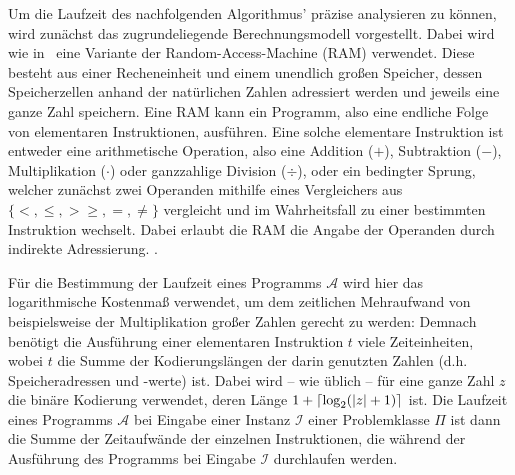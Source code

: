 Um die Laufzeit des nachfolgenden Algorithmus' präzise analysieren zu können, wird zunächst das zugrundeliegende Berechnungsmodell vorgestellt.
Dabei wird wie in~\cite{Gritzmann2013} eine Variante der Random-Access-Machine (RAM) verwendet.
Diese besteht aus einer Recheneinheit und einem unendlich großen Speicher, dessen Speicherzellen anhand der natürlichen Zahlen adressiert werden und jeweils eine ganze Zahl speichern.
Eine RAM kann ein Programm, also eine endliche Folge von elementaren Instruktionen, ausführen.
Eine solche elementare Instruktion ist entweder eine arithmetische Operation, also eine Addition ($+$), Subtraktion ($-$), Multiplikation ($\cdot$) oder ganzzahlige Division ($\div$), oder ein bedingter Sprung, welcher zunächst zwei Operanden mithilfe eines Vergleichers aus $\{ <, \leq, > \geq, =, \neq \}$ vergleicht und im Wahrheitsfall zu einer bestimmten Instruktion wechselt.
Dabei erlaubt die RAM die Angabe der Operanden durch indirekte Adressierung.
.

Für die Bestimmung der Laufzeit eines Programms $\mathcal{A}$ wird hier das logarithmische Kostenmaß verwendet, um dem zeitlichen Mehraufwand von beispielsweise der Multiplikation großer Zahlen gerecht zu werden:
Demnach benötigt die Ausführung einer elementaren Instruktion $t$ viele Zeiteinheiten, wobei $t$ die Summe der Kodierungslängen der darin genutzten Zahlen (d.h. Speicheradressen und -werte) ist.
Dabei wird -- wie üblich -- für eine ganze Zahl $z$ die binäre Kodierung verwendet, deren Länge $1 + \lceil \log_2(\lvert z\rvert+1)  \rceil$ ist. 
Die Laufzeit eines Programms $\mathcal{A}$ bei Eingabe einer Instanz $\mathcal{I}$ einer Problemklasse $\Pi$ ist dann die Summe der Zeitaufwände der einzelnen Instruktionen, die während der Ausführung des Programms bei Eingabe $\mathcal{I}$ durchlaufen werden.


